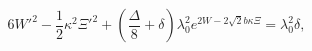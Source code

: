 \begin{equation}
6 {W'}^{2} - \frac{1}{2} \kappa^{2} {\Xi'}^{2} 
+ \left(\frac{\Delta}{8} + \delta \right) \lambda_{0}^{2} e^{2W - 2 \sqrt{2} b \kappa \Xi}  
= \lambda_0^2 \delta,
\label{eq:Einstein_zzz}
\end{equation}

